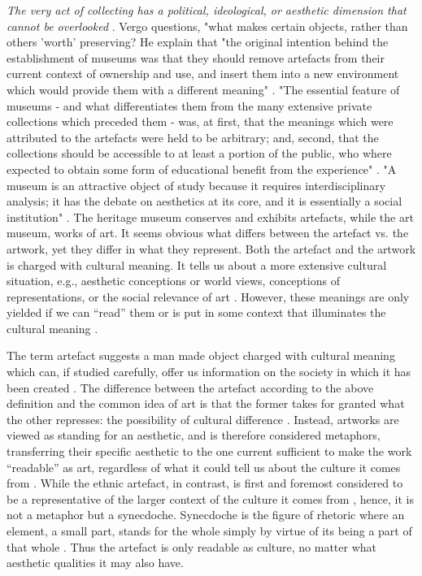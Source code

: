 \emph{The very act of collecting has a political, ideological, or aesthetic dimension that cannot be overlooked} \autocite[p. 2]{vergo_museology_1989}. Vergo questions, "what makes certain objects, rather than others 'worth' preserving? He explain that "the original intention behind the establishment of museums was that they should remove artefacts from their current context of ownership and use, and insert them into a new environment which would provide them with a different meaning" \autocite[p. 6]{vergo_museology_1989}. "The essential feature of museums - and what differentiates them from the many extensive private collections which preceded them - was, at first, that the meanings which were attributed to the artefacts were held to be arbitrary; and, second, that the collections should be accessible to at least a portion of the public, who where expected to obtain some form of educational benefit from the experience" \autocite[p. 6]{vergo_museology_1989}. "A museum is an attractive object of study because it requires interdisciplinary analysis; it has the debate on aesthetics at its core, and it is essentially a social institution" \autocite[p. 202]{Thi_book}. The heritage museum conserves and exhibits artefacts, while the art museum, works of art. It seems obvious what differs between the artefact vs. the artwork, yet they differ in what they represent. Both the artefact and the artwork is charged with cultural meaning. It tells us about a more extensive cultural situation, e.g., aesthetic conceptions or world views, conceptions of representations, or the social relevance of art \autocite[p. 206]{Thi_book}. However, these meanings are only yielded if we can “read” them or is put in some context that illuminates the cultural meaning \autocite[p. 206]{Thi_book}.

The term artefact suggests a man made object charged with cultural meaning which can, if studied carefully, offer us information on the society in which it has been created \autocite[p. 205]{Thi_book}. The difference between the artefact according to the above definition and the common idea of art is that the former takes for granted what the other represses: the possibility of cultural difference \autocite[p. 205]{Thi_book}. Instead, artworks are viewed as standing for an aesthetic, and is therefore considered metaphors, transferring their specific aesthetic to the one current sufficient to make the work “readable” as art, regardless of what it could tell us about the culture it comes from \autocite[p. 206]{Thi_book}. While the ethnic artefact, in contrast, is first and foremost considered to be a representative of the larger context of the culture it comes from \autocite[p. 206]{Thi_book}, hence, it is not a metaphor but a synecdoche. Synecdoche is the figure of rhetoric where an element, a small part, stands for the whole simply by virtue of its being a part of that whole \autocite[p. 206]{Thi_book}. Thus the artefact is only readable as culture, no matter what aesthetic qualities it may also have.

